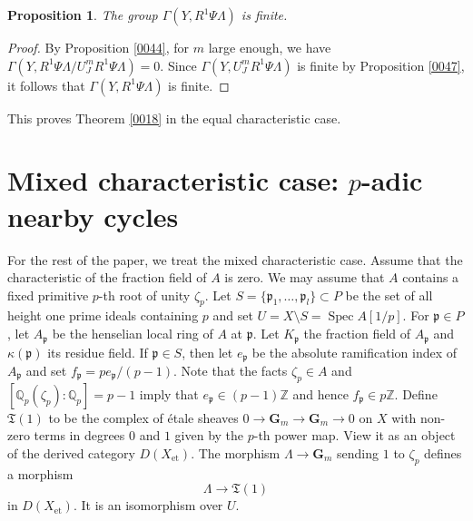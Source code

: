 \documentclass{amsart}
\newtheorem{Prop}[Thm]{Proposition}
\theoremstyle{remark}
\numberwithin{equation}{section}
\newcommand{\Z}{\mathbb{Z}}
\newcommand{\Q}{\mathbb{Q}}
\newcommand{\et}{\mathrm{et}}
\newcommand{\Gm}{\mathbf{G}_{m}}
\newcommand{\ideal}[1]{\mathfrak{#1}}
\DeclareMathOperator{\Spec}{Spec}
\begin{document}
\begin{Prop}
	The group $\Gamma(Y, R^{1} \Psi \Lambda)$ is finite.
\end{Prop}

\begin{proof}
	By Proposition \ref{0044},
	for $m$ large enough, we have
	$\Gamma(Y, R^{1} \Psi \Lambda / U_{J}^{m} R^{1} \Psi \Lambda) = 0$.
	Since $\Gamma(Y, U_{J}^{m} R^{1} \Psi \Lambda)$ is finite by
	Proposition \ref{0047},
	it follows that $\Gamma(Y, R^{1} \Psi \Lambda)$ is finite.
\end{proof}

This proves Theorem \ref{0018} in the equal characteristic case.


\section{%
	\texorpdfstring{Mixed characteristic case: $p$-adic nearby cycles}
	{Mixed characteristic case: p-adic nearby cycles}
}
\label{0036}

For the rest of the paper, we treat the mixed characteristic case.
Assume that the characteristic of the fraction field of $A$ is zero.
We may assume that $A$ contains a fixed primitive $p$-th root of unity $\zeta_{p}$.
Let $S = \{\ideal{p}_{1}, \dots, \ideal{p}_{l}\} \subset P$ be
the set of all height one prime ideals containing $p$ and set $U = X \setminus S = \Spec A[1 / p]$.
For $\ideal{p} \in P$, let $A_{\ideal{p}}$ be the henselian local ring of $A$ at $\ideal{p}$.
Let $K_{\ideal{p}}$ the fraction field of $A_{\ideal{p}}$
and $\kappa(\ideal{p})$ its residue field.
If $\ideal{p} \in S$,
then let $e_{\ideal{p}}$ be the absolute ramification index of $A_{\ideal{p}}$
and set $f_{\ideal{p}} = p e_{\ideal{p}} / (p - 1)$.
Note that the facts $\zeta_{p} \in A$ and $[\Q_{p}(\zeta_{p}) : \Q_{p}] = p - 1$ imply that
$e_{\ideal{p}} \in (p - 1) \Z$ and hence $f_{\ideal{p}} \in p \Z$.
Define $\mathfrak{T}(1)$ to be the complex of \'etale sheaves $0 \to \Gm \to \Gm \to 0$ on $X$
with non-zero terms in degrees $0$ and $1$
given by the $p$-th power map.
View it as an object of the derived category $D(X_{\et})$.
The morphism $\Lambda \to \Gm$ sending $1$ to $\zeta_{p}$ defines a morphism
	\begin{equation} \label{0000}
		\Lambda \to \mathfrak{T}(1)
	\end{equation}
in $D(X_{\et})$.
It is an isomorphism over $U$.
\end{document}
